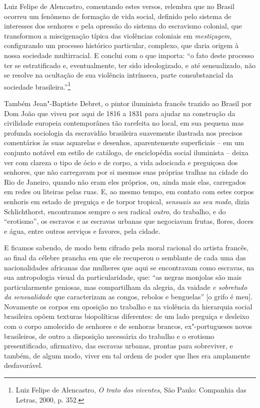 Luiz Felipe de Alencastro, comentando estes versos, relembra que no
Brasil ocorreu um fenômeno de formação de vida social, definido pelo
sistema de interesses dos senhores e pela opressão do sistema do
escravismo colonial, que transformou a miscigenação típica das
violências coloniais em \emph{mestiçagem}, configurando um processo
histórico particular, complexo, que daria origem à nossa sociedade
multirracial. E conclui com o que importa: ``o fato deste processo ter
se estratificado e, eventualmente, ter sido ideologizado, e até
sensualizado, não se resolve na ocultação de sua violência intrínseca,
parte consubstancial da sociedade brasileira.''\footnote{Luiz Felipe de
  Alencastro, \emph{O trato dos viventes}, São Paulo: Companhia das
  Letras, 2000, p. 352.}

Também Jean"-Baptiste Debret, o pintor iluminista francês trazido ao
Brasil por Dom João  que viveu por aqui de 1816 a 1831 para ajudar na
construção da civilidade europeia contemporânea tão rarefeita no local,
em sua pequena mas profunda sociologia da escravidão brasileira
suavemente ilustrada nos precisos comentários às suas aquarelas e
desenhos, aparentemente superficiais -- em um conjunto notável em estilo
de catálogo, de enciclopédia social iluminista -- deixa ver com clareza
o tipo de ócio e de corpo, a vida adocicada e preguiçosa dos senhores,
que não carregavam por si mesmos suas próprias tralhas na cidade do Rio
de Janeiro, quando não eram eles próprios, ou, ainda mais elas,
carregados em redes ou liteiras pelas ruas. E, ao mesmo tempo, em
contato com estes corpos senhoris em estado de preguiça e de torpor
tropical, \emph{sensuais} \emph{ao} \emph{seu} \emph{modo}, dizia
Schlichthorst, encontramos sempre o seu radical \emph{outro}, do
trabalho, e do ``erotismo'', os escravos e as escravas urbanas que
negociavam frutas, flores, doces e água, entre outros serviços e
favores, pela cidade.

E ficamos sabendo, de modo bem cifrado pela moral racional do artista
francês, ao final da célebre prancha em que ele recuperou o semblante de
cada uma das nacionalidades africanas das mulheres que aqui se
encontravam como escravas, na sua antropologia visual da
particularidade, que: ``as negras monjolas são mais particularmente
geniosas, mas compartilham da alegria, da vaidade \emph{e sobretudo da
sensualidade} que caracterizam as congos, rebolos e benguelas'' {[}o
grifo é meu{]}. Novamente os corpos em oposição no trabalho e na
violência da hierarquia social brasileira opõem texturas biopolíticas
diferentes: de um lado preguiça e desleixo com o corpo amolecido de
senhores e de senhoras brancos, ex"-portugueses novos brasileiros, de
outro a disposição necessária do trabalho e o erotismo presentificado,
afirmativo, das escravas urbanas, prontas para sobreviver, e também, de
algum modo, viver em tal ordem de poder que lhes era amplamente
desfavorável.

